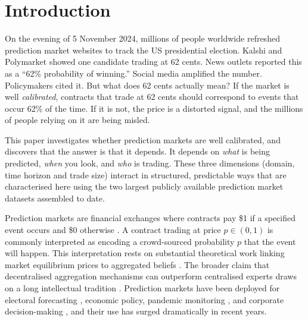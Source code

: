 \documentclass[numsec,webpdf,modern,medium]{oup-authoring-template}
\theoremstyle{thmstyleone}%
\theoremstyle{thmstyletwo}%
\theoremstyle{thmstylethree}%
\begin{document}
\section{Introduction}\label{sec:intro}

On the evening of 5 November 2024, millions of people worldwide refreshed prediction market websites to track the US presidential election. Kalshi and Polymarket showed one candidate trading at 62 cents. News outlets reported this as a ``62\% probability of winning.'' Social media amplified the number. Policymakers cited it. But what does 62 cents actually mean? If the market is well \emph{calibrated}, contracts that trade at 62 cents should correspond to events that occur 62\% of the time. If it is not, the price is a distorted signal, and the millions of people relying on it are being misled.

This paper investigates whether prediction markets are well calibrated, and discovers that the answer is that it depends. It depends on \emph{what} is being predicted, \emph{when} you look, and \emph{who} is trading. These three dimensions (domain, time horizon and trade size) interact in structured, predictable ways that are characterised here using the two largest publicly available prediction market datasets assembled to date.

Prediction markets are financial exchanges where contracts pay \$1 if a specified event occurs and \$0 otherwise \citep{forsythe1992anatomy,rhode2004historical}. A contract trading at price $p \in (0,1)$ is commonly interpreted as encoding a crowd-sourced probability $p$ that the event will happen. This interpretation rests on substantial theoretical work linking market equilibrium prices to aggregated beliefs \citep{wolfers2004prediction,manski2006interpreting,arrow2008promise}. The broader claim that decentralised aggregation mechanisms can outperform centralised experts draws on a long intellectual tradition \citep{galton1907vox,hayek1945use,surowiecki2004wisdom,hong2004groups}. Prediction markets have been deployed for electoral forecasting \citep{forsythe1992anatomy,berg2008prediction,rothschild2009forecasting}, economic policy, pandemic monitoring \citep{hanson2003combinatorial}, and corporate decision-making \citep{cowgill2015corporate}, and their use has surged dramatically in recent years.
\end{document}
